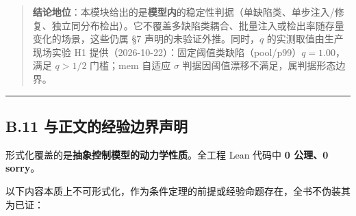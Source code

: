 \begin{quote}
\textbf{结论地位}：本模块给出的是\textbf{模型内}的稳定性判据（单缺陷类、单步注入/修复、独立同分布检出）。它不覆盖多缺陷类耦合、批量注入或检出率随存量变化的场景，这些仍属
§7 声明的未验证外推。同时，\(q\) 的实测取值由生产现场实验 H1
提供（2026-10-22）：固定阈值类缺陷（pool/p99）\(q=1.00\)，满足 \(q>1/2\)
门槛；mem 自适应 \(\sigma\) 判据因阈值漂移不满足，属判据形态边界。
\end{quote}

\begin{center}\rule{0.5\linewidth}{0.5pt}\end{center}

\subsection{B.11
与正文的经验边界声明}\label{b.11-ux4e0eux6b63ux6587ux7684ux7ecfux9a8cux8fb9ux754cux58f0ux660e}

形式化覆盖的是\textbf{抽象控制模型的动力学性质}。全工程 Lean 代码中
\textbf{0 公理、0 sorry}。

以下内容本质上不可形式化，作为条件定理的前提或经验命题存在，全书不伪装其为已证：

